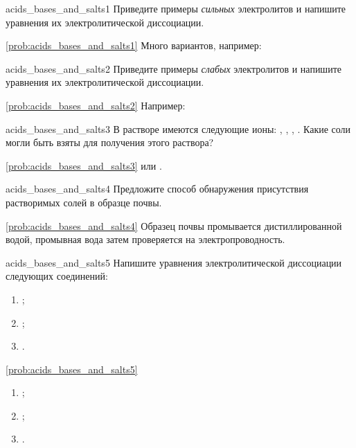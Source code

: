 \begin{problem}{}{acids_bases_and_salts1}
    Приведите примеры \emph{сильных} электролитов и напишите уравнения их электролитической диссоциации.
    \begin{sol}{\ref{prob:acids_bases_and_salts1}}
        Много вариантов, например:
    \end{sol}
\end{problem}

\begin{problem}{}{acids_bases_and_salts2}
    Приведите примеры \emph{слабых} электролитов и напишите уравнения их электролитической диссоциации.
    \begin{sol}{\ref{prob:acids_bases_and_salts2}}
        Например:
    \end{sol}
\end{problem}

\begin{problem}{}{acids_bases_and_salts3}
    В растворе имеются следующие ионы: , , , . Какие соли могли быть взяты для получения этого раствора?
    \begin{sol}{\ref{prob:acids_bases_and_salts3}}
         или .
    \end{sol}
\end{problem}

\begin{problem}{}{acids_bases_and_salts4}
    Предложите способ обнаружения присутствия растворимых солей в образце почвы.
    \begin{sol}{\ref{prob:acids_bases_and_salts4}}
        Образец почвы промывается дистиллированной водой, промывная вода затем проверяется на электропроводность.
    \end{sol}
\end{problem}

\begin{problem}{}{acids_bases_and_salts5}
    Напишите уравнения электролитической диссоциации следующих соединений:
    \begin{enumerate}[label=\arabic*)]
        \item {};
        \item {};
        \item {}.
    \end{enumerate}
    \begin{sol}{\ref{prob:acids_bases_and_salts5}}
        \begin{enumerate}[label=\arabic*)]
            \item {};
            \item {};
            \item {}.
        \end{enumerate}
    \end{sol}
\end{problem}

